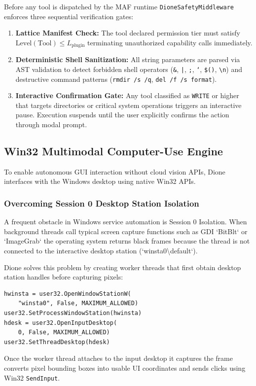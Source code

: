 \documentclass[conference,a4paper]{IEEEtran}
\begin{document}
Before any tool is dispatched by the MAF runtime \texttt{DioneSafetyMiddleware} enforces three sequential verification gates:
\begin{enumerate}
    \item \textbf{Lattice Manifest Check:} The tool declared permission tier must satisfy $\text{Level}(\text{Tool}) \le L_{\text{plugin}}$ terminating unauthorized capability calls immediately.
    \item \textbf{Deterministic Shell Sanitization:} All string parameters are parsed via AST validation to detect forbidden shell operators (\texttt{\&}, \texttt{|}, \texttt{;}, \texttt{`}, \texttt{\$()}, \texttt{\textbackslash n}) and destructive command patterns (\texttt{rmdir /s /q}, \texttt{del /f /s format}).
    \item \textbf{Interactive Confirmation Gate:} Any tool classified as \texttt{WRITE} or higher that targets directories or critical system operations triggers an interactive pause. Execution suspends until the user explicitly confirms the action through modal prompt.
\end{enumerate}

\subsection{Win32 Multimodal Computer-Use Engine}
To enable autonomous GUI interaction without cloud vision APIs, Dione interfaces with the Windows desktop using native Win32 APIs.

\subsubsection{Overcoming Session 0 Desktop Station Isolation}
A frequent obstacle in Windows service automation is Session 0 Isolation. When background threads call typical screen capture functions such as GDI `BitBlt` or `ImageGrab` the operating system returns black frames because the thread is not connected to the interactive desktop station (`winsta0\textbackslash default`).

Dione solves this problem by creating worker threads that first obtain desktop station handles before capturing pixels:
\begin{verbatim}
hwinsta = user32.OpenWindowStationW(
    "winsta0", False, MAXIMUM_ALLOWED)
user32.SetProcessWindowStation(hwinsta)
hdesk = user32.OpenInputDesktop(
    0, False, MAXIMUM_ALLOWED)
user32.SetThreadDesktop(hdesk)
\end{verbatim}
Once the worker thread attaches to the input desktop it captures the frame converts pixel bounding boxes into usable UI coordinates and sends clicks using Win32 \texttt{SendInput}.
\end{document}
